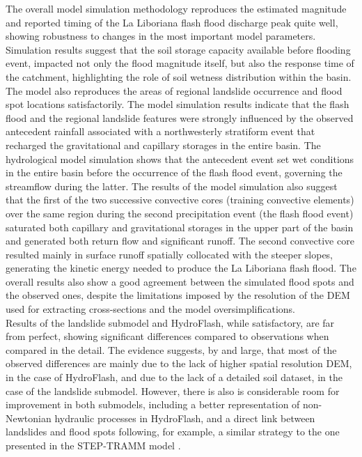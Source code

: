 \documentclass[hess, manuscript]{copernicus}
\begin{document}
The overall model simulation methodology reproduces the estimated magnitude and reported timing of the La Liboriana flash flood discharge peak quite well, showing robustness to changes in the most important model parameters. Simulation results suggest that the soil storage capacity available before flooding event, impacted not only the flood magnitude itself, but also the response time of the catchment, highlighting the role of soil wetness distribution within the basin. The model also reproduces the areas of regional landslide occurrence and flood spot locations satisfactorily. The model simulation results indicate that the flash flood and the regional landslide features were strongly influenced by the observed antecedent rainfall associated with a northwesterly stratiform event that recharged the gravitational and capillary storages in the entire basin. The hydrological model simulation shows that the antecedent event set wet conditions in the entire basin before the occurrence of the flash flood event, governing the streamflow during the latter.  The results of the model simulation also suggest that the first of the two successive convective cores (training convective elements) over the same region during the second precipitation event (the flash flood event) saturated both capillary and gravitational storages in the upper part of the basin and generated both return flow and significant runoff. The second convective core resulted mainly in surface runoff spatially collocated with the steeper slopes, generating the kinetic energy needed to produce the La Liboriana flash flood. The overall results also show a good agreement between the simulated flood spots and the observed ones, despite the limitations imposed by the resolution of the DEM used for extracting cross-sections and the model oversimplifications. \\

Results of the landslide submodel and HydroFlash, while satisfactory, are far from perfect, showing significant differences compared to observations when compared in the  detail. The evidence suggests, by and large, that most of the observed differences are mainly due to the lack of higher spatial resolution DEM, in the case of HydroFlash, and due to the lack of a detailed soil dataset, in the case of the landslide submodel. However, there is also is considerable room for improvement in both submodels, including a better representation of non-Newtonian hydraulic processes in HydroFlash, and a direct link between landslides and flood spots following, for example, a similar strategy to the one presented in the STEP-TRAMM model \citep{Fan2017a}.\\
\end{document}
